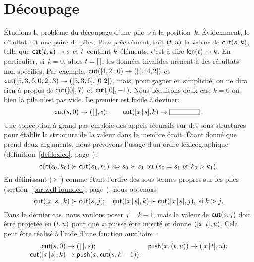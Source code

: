 \section{Découpage}
\label{sec:cutting}

 Étudions le problème du découpage d'une
pile~\(s\) à la position~\(k\). Évidemment, le résultat est une paire
de piles. Plus précisément, soit \(({t},{u})\) la valeur de
\(\textsf{cut}(s,k)\), telle que \(\textsf{cat}(t,u) \twoheadrightarrow
s\) et \(t\)~contient \(k\)~éléments,
c'est-à-dire \(\textsf{len}(t) \twoheadrightarrow k\). En particulier,
si~\(k = 0\), alors \(t = [\,]\); les données invalides mènent à des
résultats non-spécifiés. Par exemple, \(\textsf{cut}([4,2],0)
\twoheadrightarrow ({[\,]},{[4,2]})\) et \(\textsf{cut}([5,3,6,0,2],3)
\twoheadrightarrow ({[5,3,6]},{[0,2]})\), mais, pour gagner en
simplicité, on ne dira rien à propos de \(\textsf{cut}([0],7)\) et
\(\textsf{cut}([0],-1)\). Nous déduisons deux cas: \(k = 0\) ou bien la
pile n'est pas vide. Le premier est facile à deviner:
\begin{equation*}
\fun{cut}(s,0)           \rightarrow \pair{\el}{s};\qquad
\fun{cut}(\cons{x}{s},k) \rightarrow \fbcode{CCCCCC}\,.
\end{equation*}
Une conception à grand pas emploie des
appels récursifs sur des sous-structures pour établir la structure de
la valeur dans le membre droit. Étant donné que  prend deux
arguments, nous prévoyons l'usage d'un ordre lexicographique
(définition~\eqref{def:lexico}, page~\pageref{def:lexico}):
\begin{equation*}
\textsf{cut}(s_0,k_0) \succ \textsf{cut}(s_1,k_1)
:\Leftrightarrow
\text{\(s_0 \succ s_1\) ou (\(s_0 = s_1\) et \(k_0 > k_1\))}.
\end{equation*}
En définissant (\(\succ\)) comme étant l'ordre des sous-termes
propres sur les piles
(section~\ref{par:well-founded}, page~\pageref{par:well-founded}),
nous obtenons
\begin{equation*}
\textsf{cut}([{x}\!\mid\!{s}],k) \succ \textsf{cut}(s,j);\quad
\textsf{cut}([{x}\!\mid\!{s}],k) \succ \textsf{cut}([{x}\!\mid\!{s}],j),\;
\text{si \(k > j\)}.
\end{equation*}
Dans le dernier cas, nous voulons poser \(j=k-1\), mais la valeur de
\(\textsf{cut}(s,j)\) doit être projetée en \(({t},{u})\) pour
que~\(x\) puisse être injecté et donne \(({[{x}\!\mid\!{t}]},{u})\). Cela
peut être réalisé à l'aide d'une fonction
auxiliaire~:
\begin{equation*}
\begin{array}{@{}r@{\;}l@{\;}lr@{\;}l@{\;}l@{}}
\fun{cut}(s,0) & \rightarrow & \pair{\el}{s};
& \fun{push}(x,\pair{t}{u}) & \rightarrow & \pair{\cons{x}{t}}{u}.\\
\fun{cut}(\cons{x}{s},k) & \rightarrow
& \fun{push}(x,\fun{cut}(s,k-1)).
\end{array}
\end{equation*}



